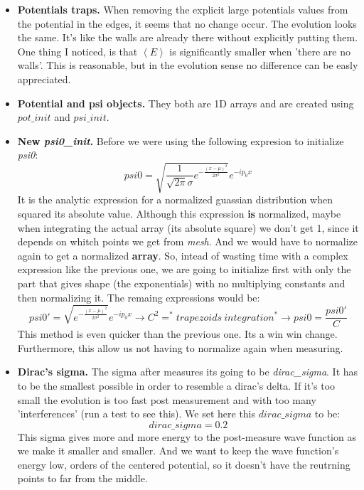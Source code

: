 \documentclass{article}
\begin{document}
\begin{itemize}
\begin{itemize}
		
	\end{itemize}
	
	\item \textbf{Potentials traps.} When removing the explicit large potentials values from the potential in the edges, it seems that no change occur.  The evolution looks the same. It's like the walls are already there without explicitly putting them. One thing  I noticed, is that $\left\langle E \right\rangle$ is significantly smaller when 'there are no walls'. This is reasonable, but in the evolution sense no difference can be easly appreciated.
	
	\item \textbf{Potential and psi objects.} They both are 1D arrays and are created using $pot\_init$ and $psi\_init$.
	
	\item \textbf{New \textit{psi0\_init}.} Before we were using the following expresion to initialize \textit{psi0}:
	\[
	psi0 = \sqrt{\frac{1}{\sqrt{2\pi}\sigma}e^{-\frac{(x-\mu)^2}{2\sigma^2}}} e^{-ip_0x}
	\]
	It is the analytic expression for a normalized guassian distribution when squared its absolute value. Although this expression \textbf{is} normalized, maybe when integrating the actual array (its absolute square)  we don't get 1, since it depends on whitch points we get from \textit{mesh}. And we would have to normalize again to get a normalized \textbf{array}. So, intead of wasting time with a complex expression like the previous one, we are going to initialize first with only the part that gives shape (the exponentials) with no multiplying constants and then normalizing it. The remaing expressions would be:
	\[
	psi0' = \sqrt{e^{-\frac{(x-\mu)^2}{2\sigma^2}}} e^{-ip_0x} \rightarrow C^2 =  ^*trapezoids\ integration^* \rightarrow psi0 = \frac{psi0'}{C}
	\]
	This method is even quicker than the previous one. Its a win win change. Furthermore, this allow us not having to normalize again when measuring.
	
	\item \textbf{Dirac's sigma.} The sigma after measures its going to be \textit{dirac\_sigma}. It has to be the smallest possible in order to resemble a dirac's delta. If it's too small the evolution is too fast post measurement and with too many 'interferences' (run a test to see this). We set here this $dirac\_sigma$ to be:
	\[
	dirac\_sigma = 0.2
	\]
	This sigma gives more and more energy to the post-measure wave function as we make it smaller and smaller. And we want to keep the wave function's energy low, orders of the centered potential, so it doesn't have the reutrning points to far from the middle.
	

\end{itemize}
\end{document}

